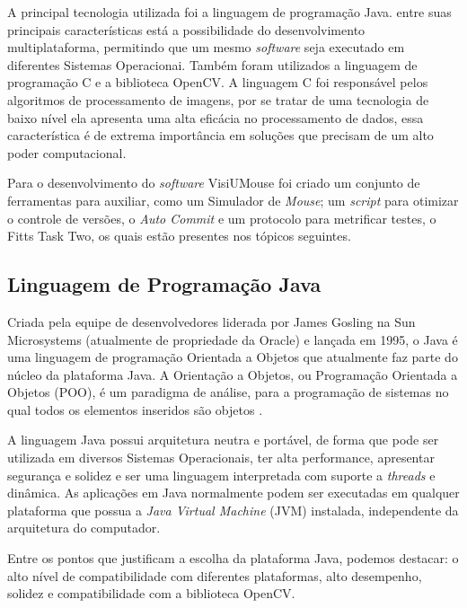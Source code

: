 
A principal tecnologia utilizada foi a linguagem de programação Java. entre suas principais características está a possibilidade do desenvolvimento multiplataforma, permitindo que um mesmo \textit{software} seja executado em diferentes Sistemas Operacionai. Também foram utilizados a linguagem de programação C e a biblioteca OpenCV. A linguagem C foi responsável pelos algoritmos de processamento de imagens, por se tratar de uma tecnologia de baixo nível ela apresenta uma alta eficácia no processamento de dados, essa característica é de extrema importância em soluções que precisam de um alto poder computacional.

Para o desenvolvimento do \textit{software} VisiUMouse foi criado um conjunto de ferramentas para auxiliar, como um Simulador de \textit{Mouse}; um \textit{script} para otimizar o controle de versões, o \textit{Auto Commit} e um protocolo para metrificar testes, o Fitts Task Two, os quais estão presentes nos tópicos seguintes.

\subsection{Linguagem de Programação Java}

Criada pela equipe de desenvolvedores liderada por James Gosling na Sun Microsystems (atualmente de propriedade da Oracle) e lançada em 1995, o Java é uma linguagem de programação Orientada a Objetos que atualmente faz parte do núcleo da plataforma Java. A Orientação a Objetos, ou Programação Orientada a Objetos (POO), é um paradigma de análise, para a programação de sistemas no qual todos os elementos inseridos são objetos \cite{urma2014java}.

A linguagem Java possui arquitetura neutra e portável, de forma que pode ser utilizada em diversos Sistemas Operacionais, ter alta performance, apresentar segurança e solidez e ser uma linguagem interpretada com suporte a \textit{threads} e dinâmica. As aplicações em Java normalmente podem ser executadas em qualquer plataforma que possua a \textit{Java Virtual Machine} (JVM) instalada, independente da arquitetura do computador.

Entre os pontos que justificam a escolha da plataforma Java, podemos destacar: o alto nível de compatibilidade com diferentes plataformas, alto desempenho, solidez e compatibilidade com a biblioteca OpenCV.


